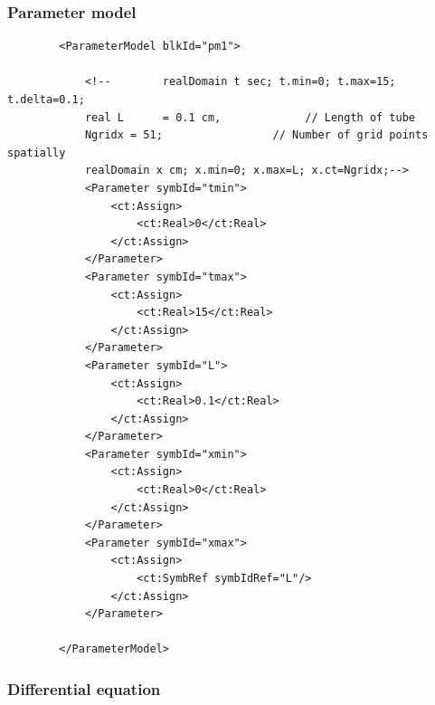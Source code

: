 \subsubsection*{Parameter model}

\lstset{language=XML}
\begin{lstlisting}
        <ParameterModel blkId="pm1">            
            
            <!--        realDomain t sec; t.min=0; t.max=15; t.delta=0.1;
            real L      = 0.1 cm,             // Length of tube
            Ngridx = 51;                 // Number of grid points spatially 
            realDomain x cm; x.min=0; x.max=L; x.ct=Ngridx;-->
            <Parameter symbId="tmin">
                <ct:Assign>
                    <ct:Real>0</ct:Real>
                </ct:Assign>
            </Parameter>
            <Parameter symbId="tmax">
                <ct:Assign>
                    <ct:Real>15</ct:Real>
                </ct:Assign>
            </Parameter>
            <Parameter symbId="L">
                <ct:Assign>
                    <ct:Real>0.1</ct:Real>
                </ct:Assign>
            </Parameter>
            <Parameter symbId="xmin">
                <ct:Assign>
                    <ct:Real>0</ct:Real>
                </ct:Assign>
            </Parameter>
            <Parameter symbId="xmax">
                <ct:Assign>
                    <ct:SymbRef symbIdRef="L"/>
                </ct:Assign>
            </Parameter>
            
        </ParameterModel>
\end{lstlisting}


\subsubsection*{Differential equation}

